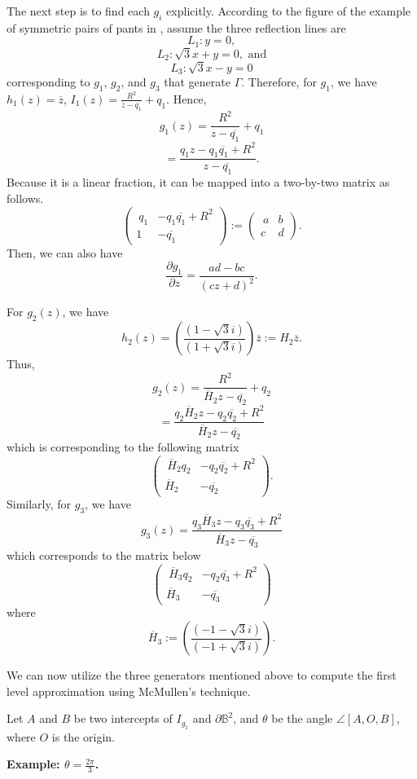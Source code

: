 \documentclass[12pt,oneside]{sfsuthesis}
\theoremstyle{plain} %
\theoremstyle{definition}  %
\theoremstyle{remark}  %
\theoremstyle{plain}
\begin{document}
{The next step is to find each $g_i$ explicitly. According to the figure of the example of symmetric pairs of pants in \cite{mcmullen1998hausdorff}, assume the three reflection lines are 
$$L_1: y=0,$$ 
$$L_2: \sqrt{3} x+ y=0, \text{ and}$$ 
$$L_3: \sqrt{3} x- y=0$$
corresponding to $g_1$, $g_2$, and $g_3$ that generate $\Gamma$. Therefore, for $g_1$, we have $h_1(z)=\overline{z}$, $I_1(z)=\frac{R^2}{\overline{z}-\overline{q_1}}+q_1$. Hence,
$$
g_1(z)=\frac{R^2}{z-\overline{q_1}}+q_1
$$
$$
=\frac{q_1z-q_1\overline{q_1}+R^2}{z-\overline{q_1}}.
$$
Because it is a linear fraction, it can be mapped into a two-by-two matrix as follows.
$$
\begin{pmatrix}\
q_1 & -q_1\overline{q_1}+R^2 \\
1 &  -\overline{q_1}
\end{pmatrix}:=\begin{pmatrix}\
a & b \\
c &  d
\end{pmatrix}.
$$
Then, we can also have
$$
\frac{\partial g_1}{\partial z} = \frac{ad-bc}{(cz+d)^2}.
$$

For $g_2(z)$, we have
$$
h_2(z)=\left(\frac{(1-\sqrt{3}i)}{(1+\sqrt{3}i)} \right)\overline{z}:=H_2\overline{z}.
$$
Thus, 
$$
g_2(z)=\frac{R^2}{\overline{H}_2 z-\overline{q_2}}+q_2
$$
$$
=\frac{q_2 \overline{H}_2 z-q_2\overline{q_2}+R^2}{\overline{H}_2 z-\overline{q_2}}
$$
which is corresponding to the following matrix
$$
\begin{pmatrix}\
\overline{H}_2 q_2 & -q_2\overline{q_2}+R^2 \\
\overline{H}_2 &  -\overline{q_2}
\end{pmatrix}.
$$
Similarly, for $g_3$, we have
$$
g_3(z)=\frac{q_3 \overline{H}_3 z-q_3\overline{q_3}+R^2}{\overline{H}_3 z-\overline{q_3}}
$$
which corresponds to the matrix below
$$
\begin{pmatrix}\
\overline{H}_3 q_2 & -q_2\overline{q_3}+R^2 \\
\overline{H}_3 &  -\overline{q_3}
\end{pmatrix}
$$
where 
$$
\overline{H}_3:=\left(\frac{(-1-\sqrt{3}i)}{(-1+\sqrt{3}i)} \right).
$$

We can now utilize the three generators mentioned above to compute the first level approximation using McMullen's technique.

Let $A$ and $B$ be two intercepts of $I_{g_1}$ and $\partial \mathbb{B}^2$, and $\theta$ be the angle $\angle [A,O,B]$, where $O$ is the origin. 

\noindent \textbf{Example: $\theta=\frac{2\pi}{3}$.} 


}
\end{document}
